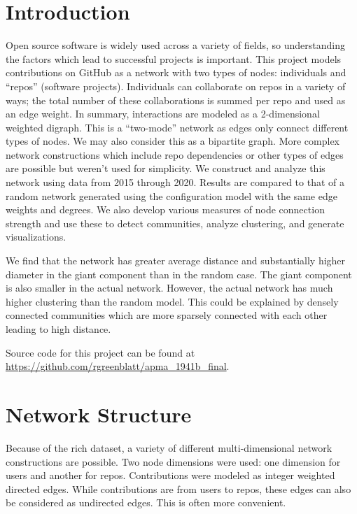 \documentclass{pset}
\begin{document}
\section*{Introduction}

Open source software is widely used across a variety of fields, so
understanding the factors which lead to successful projects is important.  This
project models contributions on GitHub as a network with two types of nodes:
individuals and ``repos'' (software projects). Individuals can collaborate on
repos in a variety of ways; the total number of these collaborations is summed
per repo and used as an edge weight. In summary, interactions are modeled as a
2-dimensional weighted digraph. This is a ``two-mode'' network as edges only
connect different types of nodes. We may also consider this as a bipartite
graph. More complex network constructions which include repo dependencies or
other types of edges are possible but weren't used for simplicity.  We
construct and analyze this network using data from 2015 through 2020. Results
are compared to that of a random network generated using the configuration
model with the same edge weights and degrees.  We also develop various measures of node
connection strength and use these to detect communities, analyze clustering,
and generate visualizations.

We find that the network has greater average distance and substantially higher
diameter in the giant component than in the random case. The giant component is
also smaller in the actual network. However, the actual network has much higher
clustering than the random model. This could be explained by densely connected
communities which are more sparsely connected with each other leading to high
distance. 


Source code for this project can be found  at
\href{https://github.com/rgreenblatt/apma_1941b_final}
{https://github.com/rgreenblatt/apma\_1941b\_final}.


\section*{Network Structure}

Because of the rich dataset, a variety of different multi-dimensional network
constructions are possible. Two node dimensions were used: one dimension for
users and another for repos. Contributions were modeled as integer weighted
directed edges. While contributions are from users to repos, these edges can
also be considered as undirected edges. This is often more convenient.
\end{document}
